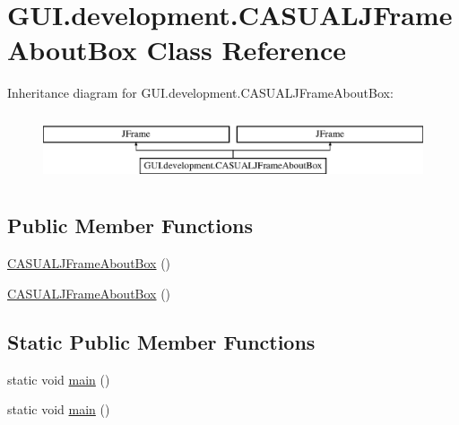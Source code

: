 \hypertarget{class_g_u_i_1_1development_1_1_c_a_s_u_a_l_j_frame_about_box}{\section{G\-U\-I.\-development.\-C\-A\-S\-U\-A\-L\-J\-Frame\-About\-Box Class Reference}
\label{class_g_u_i_1_1development_1_1_c_a_s_u_a_l_j_frame_about_box}
}
Inheritance diagram for G\-U\-I.\-development.\-C\-A\-S\-U\-A\-L\-J\-Frame\-About\-Box\-:\begin{figure}[H]
\begin{center}
\leavevmode
\includegraphics[height=2.000000cm]{class_g_u_i_1_1development_1_1_c_a_s_u_a_l_j_frame_about_box}
\end{center}
\end{figure}
\subsection*{Public Member Functions}
\begin{DoxyCompactItemize}
\item 
\hyperlink{class_g_u_i_1_1development_1_1_c_a_s_u_a_l_j_frame_about_box_a8323c1fa354fb8f2ecdaf5e373c77423}{C\-A\-S\-U\-A\-L\-J\-Frame\-About\-Box} ()
\item 
\hyperlink{class_g_u_i_1_1development_1_1_c_a_s_u_a_l_j_frame_about_box_a8323c1fa354fb8f2ecdaf5e373c77423}{C\-A\-S\-U\-A\-L\-J\-Frame\-About\-Box} ()
\end{DoxyCompactItemize}
\subsection*{Static Public Member Functions}
\begin{DoxyCompactItemize}
\item 
static void \hyperlink{class_g_u_i_1_1development_1_1_c_a_s_u_a_l_j_frame_about_box_ab86c75e03d79f695e1b26b10037f63bc}{main} ()
\item 
static void \hyperlink{class_g_u_i_1_1development_1_1_c_a_s_u_a_l_j_frame_about_box_ab86c75e03d79f695e1b26b10037f63bc}{main} ()
\end{DoxyCompactItemize}


